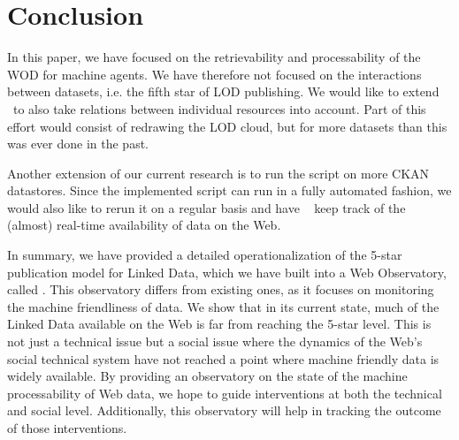 \section{Conclusion}

In this paper, we have focused on the retrievability and processability
 of the WOD for machine agents.
We have therefore not focused on the interactions between datasets,
 i.e. the fifth star of LOD publishing.
We would like to extend \obs~to also take relations between individual
 resources into account.
Part of this effort would consist of redrawing the LOD cloud,
 but for more datasets than this was ever done in the past.

Another extension of our current research is to run the \obs
 script on more CKAN datastores.
Since the implemented script can run in a fully automated fashion,
 we would also like to rerun it on a regular basis and have \obs~
 keep track of the (almost) real-time availability
 of data on the Web.

In summary, we have provided a detailed operationalization of
 the 5-star publication model for Linked Data,
 which we have built into a Web Observatory, called \obs.
This observatory differs from existing ones, as it focuses on monitoring
 the machine friendliness of data.
We show that in its current state, much of the Linked Data available on
 the Web is far from reaching the 5-star level.
This is not just a technical issue but a social issue
 where the dynamics of the Web's social technical system have not reached
 a point where machine friendly data is widely available.
By providing an observatory on the state of the machine processability of
 Web data, we hope to guide interventions at both the technical
 and social level.
Additionally, this observatory will help in tracking the outcome of
 those interventions.

